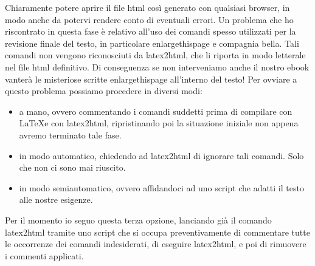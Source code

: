 Chiaramente potere aprire il file html così generato con qualsiasi browser, in 
modo anche da potervi rendere conto di eventuali errori. Un problema che ho 
riscontrato in questa fase è relativo all'uso dei comandi spesso utilizzati per 
la revisione finale del testo, in particolare enlargethispage e compagnia
bella. 
Tali comandi non vengono riconosciuti da latex2html, che li riporta in modo
letterale nel file html definitivo. Di conseguenza se non interveniamo anche il 
nostro ebook vanterà le misteriose scritte enlargethispage all'interno del 
testo! Per ovviare a questo problema possiamo procedere in diversi modi: 
\begin{itemize}
\item a mano, ovvero commentando i comandi suddetti prima di 
compilare con \LaTeX e con latex2html, ripristinando poi la situazione iniziale
non appena avremo terminato tale fase.

\item in modo automatico, chiedendo ad latex2html di ignorare tali comandi. Solo
che non ci sono mai riuscito.

\item in modo semiautomatico, ovvero affidandoci ad uno script che adatti il 
testo alle nostre esigenze.
\end{itemize}

Per il momento io seguo questa terza opzione, lanciando già il comando
latex2html tramite uno script che si occupa preventivamente di commentare tutte
le occorrenze dei comandi indesiderati, di eseguire latex2html, e poi di
rimuovere i commenti applicati.

\begin{lstlisting}
\end{lstlisting}

